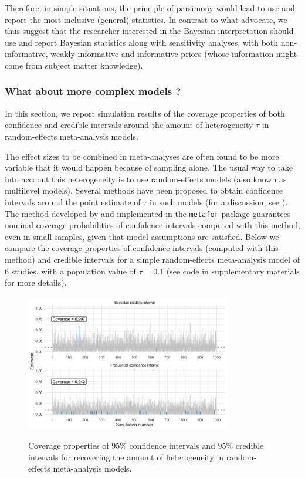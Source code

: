 \documentclass[a4paper,man,natbib,floatsintext,donotrepeattitle]{apa6}
\begin{document}
Therefore, in simple situations, the principle of parsimony would lead to use and report the most inclusive (general) statistics. In contrast to what \cite{albers_credible_2018} advocate, we thus suggest that the researcher interested in the Bayesian interpretation should use and report Bayesian statistics along with sensitivity analyses, with both non-informative, weakly informative and informative priors (whose information might come from subject matter knowledge).

\subsubsection{What about more complex models ?}

In this section, we report simulation results of the coverage properties of both confidence and credible intervals around the amount of heterogeneity $\tau$ in random-effects meta-analysis models.

The effect sizes to be combined in meta-analyses are often found to be more variable that it would happen because of sampling alone. The usual way to take into account this heterogeneity is to use random-effects models (also known as multilevel models). Several methods have been proposed to obtain confidence intervals around the point estimate of $\tau$ in such models (for a discussion, see \citealp{williams_bayesian_2018}). The method developed by \cite{paule_consensus_1982} and implemented in the \texttt{metafor} package \citep{viechtbauer_conducting_2010} guarantees nominal coverage probabilities of confidence intervals computed with this method, even in small samples, given that model assumptions are satisfied. Below we compare the coverage properties of confidence intervals (computed with this method) and credible intervals for a simple random-effects meta-analysis model of 6 studies, with a population value of $\tau = 0.1$ (see code in supplementary materials for more details).

\begin{figure}[H]
  \caption{Coverage properties of 95\% confidence intervals and 95\% credible intervals for recovering the amount of heterogeneity in random-effects meta-analysis models.}
  \centering
  \includegraphics[width=0.8\textwidth]{coverage2.png}
  \label{fig:coverage2}
\end{figure}
\end{document}
